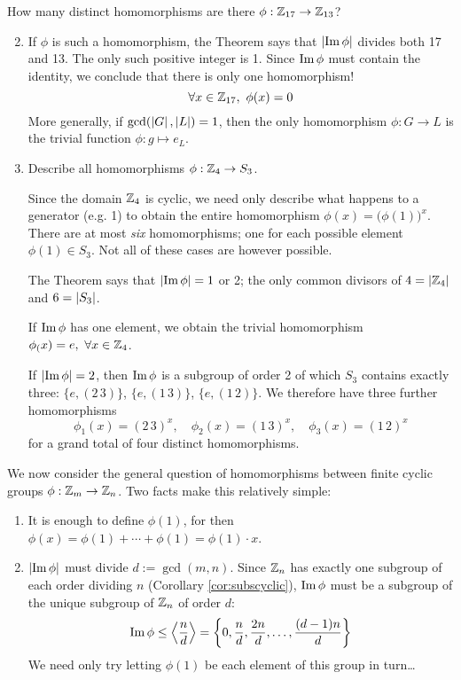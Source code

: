 \goodbreak

\begin{examples}{}{}
\exstart How many distinct homomorphisms are there $\phi:\mathbb{Z}_{17}\to\mathbb{Z}_{13}$?\vspace{-5pt}
\begin{enumerate}\setcounter{enumi}{1}
  \item[]If $\phi$ is such a homomorphism, the Theorem says that $\left| \operatorname{Im}\phi\right|$ divides both 17 and 13. The only such positive integer is 1. Since $\operatorname{Im}\phi$ must contain the identity, we conclude that there is only one homomorphism!
  \[\forall x\in\mathbb{Z}_{17},\ \phi(x)=0\]
  More generally, if $\gcd(\left| G\right|,\left| L\right|)=1$, then the only homomorphism $\phi:G\to L$ is the trivial function $\phi:g\mapsto e_L$.
  \item Describe all homomorphisms $\phi:\mathbb{Z}_4\to S_3$.\par
  Since the domain $\mathbb{Z}_4$ is cyclic, we need only describe what happens to a generator (e.g. 1) to obtain the entire homomorphism $\phi(x)=\bigl(\phi(1)\bigr)^x$. There are at most \emph{six} homomorphisms; one for each possible element $\phi(1)\in S_3$. Not all of these cases are however possible.\par
  The Theorem says that $\left| \operatorname{Im}\phi\right|=1$ or 2; the only common divisors of $4=\left| \mathbb{Z}_4\right|$ and $6=\left| S_3\right|$.\par
  If $\operatorname{Im}\phi$ has one element, we obtain the trivial homomorphism $\phi_(x)=e,\ \forall x\in\Z_4$.\par
  If $\left| \operatorname{Im}\phi\right|=2$, then $\operatorname{Im}\phi$ is a subgroup of order 2 of which $S_3$ contains  exactly three: $\{e,(2\,3)\}$, $\{e,(1\,3)\}$, $\{e,(1\,2)\}$. We therefore have three further homomorphisms
  \[\phi_1(x)=(2\,3)^x,\quad \phi_2(x)=(1\,3)^x,\quad\phi_3(x)=(1\,2)^x\]
  for a grand total of four distinct homomorphisms.
\end{enumerate}
\end{examples}

We now consider the general question of homomorphisms between finite cyclic groups $\phi:\mathbb{Z}_m\to\mathbb{Z}_n$. Two facts make this relatively simple:
\begin{enumerate}
  \item It is enough to define $\phi(1)$, for then $\phi(x)=\phi(1)+\cdots+\phi(1)=\phi(1)\cdot x$.
  \item $\left| \operatorname{Im}\phi\right|$ must divide $d:=\gcd(m,n)$. Since $\mathbb{Z}_n$ has exactly one subgroup of each order dividing $n$ (Corollary \ref{cor:subscyclic}), $\operatorname{Im}\phi$ must be a subgroup of the unique subgroup of $\mathbb{Z}_n$ of order $d$:
	\[\operatorname{Im}\phi\le\left\langle \frac nd\right\rangle=\left\{0,\frac nd,\frac{2n}d,\ldots,\frac{(d-1)n}d\right\}\]
	We need only try letting $\phi(1)$ be each element of this group in turn\ldots
\end{enumerate} 

